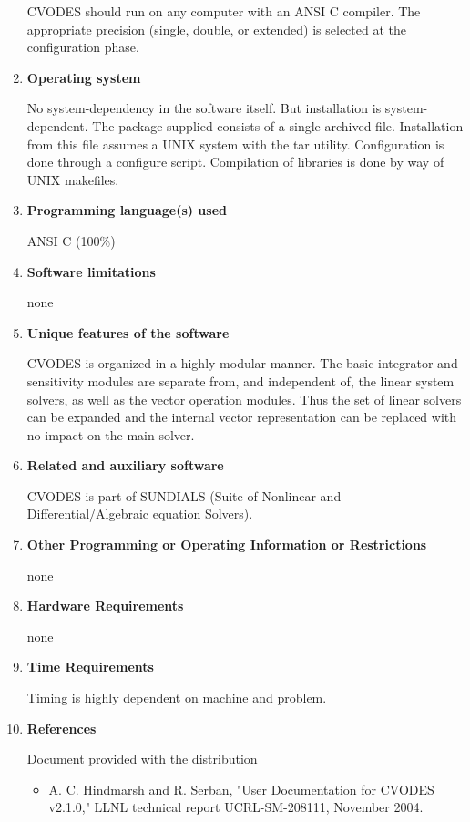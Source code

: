 \documentclass[12pt]{letter}
\begin{document}
\begin{letter}
\begin{enumerate}
CVODES should run on any computer with an ANSI C compiler. The appropriate 
precision (single, double, or extended) is selected at the configuration phase.

\item {\bf Operating system}

No system-dependency in the software itself. But installation is system-dependent. 
The package supplied consists of a single archived file. Installation from this file 
assumes a UNIX system with the tar utility. Configuration is done through a 
configure script. Compilation of libraries is done by way of UNIX makefiles.

\item {\bf Programming language(s) used}

ANSI C (100\%)

\item {\bf Software limitations}

none

\item {\bf Unique features of the software}

CVODES is organized in a highly modular manner. The basic integrator and 
sensitivity modules are separate from, and independent of, the linear system 
solvers, as well as the vector operation modules. Thus the set of linear solvers can be 
expanded and the internal vector representation can be replaced with no impact on 
the main solver.


\item {\bf Related and auxiliary software}

CVODES is part of SUNDIALS (Suite of Nonlinear and Differential/Algebraic equation 
Solvers). 

\item {\bf Other Programming or Operating Information or Restrictions}

none


\item {\bf Hardware Requirements}

none


\item {\bf Time Requirements}

Timing is highly dependent on machine and problem.


\item {\bf References}

Document provided with the distribution
\begin{itemize}
\item A. C. Hindmarsh and R. Serban, "User Documentation for CVODES v2.1.0," 
    LLNL technical report UCRL-SM-208111, November 2004.


\end{itemize}
\end{enumerate}
\end{letter}
\end{document}
